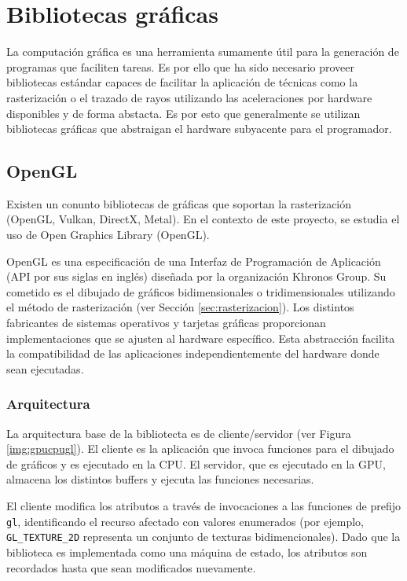 \section{Bibliotecas gráficas}

La computación gráfica es una herramienta sumamente útil para la generación de programas que faciliten tareas. Es por ello que ha sido necesario proveer bibliotecas estándar capaces de facilitar la aplicación de técnicas como la rasterización o el trazado de rayos utilizando las aceleraciones por hardware disponibles y de forma abstacta. Es por esto que generalmente se utilizan bibliotecas gráficas que abstraigan el hardware subyacente para el programador.

\subsection{OpenGL}

Existen un conunto bibliotecas de gráficas que soportan la rasterización (OpenGL, Vulkan, DirectX, Metal). En el contexto de este proyecto, se estudia el uso de Open Graphics Library (OpenGL).

OpenGL es una especificación de una Interfaz de Programación de Aplicación (API por sus siglas en inglés) diseñada por la organización Khronos Group. Su cometido es el dibujado de gráficos bidimensionales o tridimensionales utilizando el método de rasterización (ver Sección \ref{sec:rasterizacion}). Los distintos fabricantes de sistemas operativos y tarjetas gráficas proporcionan implementaciones que se ajusten al hardware específico. Esta abstracción facilita la compatibilidad de las aplicaciones independientemente del hardware donde sean ejecutadas.

\subsubsection{Arquitectura}
La arquitectura base de la bibliotecta es de cliente/servidor (ver Figura \ref{img:gpucpugl}). El cliente es la aplicación que invoca funciones para el dibujado de gráficos y es ejecutado en la CPU. El servidor, que es ejecutado en la GPU, almacena los distintos buffers y ejecuta las funciones necesarias.

El cliente modifica los atributos a través de invocaciones a las funciones de prefijo \verb|gl|, identificando el recurso afectado con valores enumerados (por ejemplo, \verb|GL_TEXTURE_2D| representa un conjunto de texturas bidimencionales). Dado que la biblioteca es implementada como una máquina de estado, los atributos son recordados hasta que sean modificados nuevamente.

